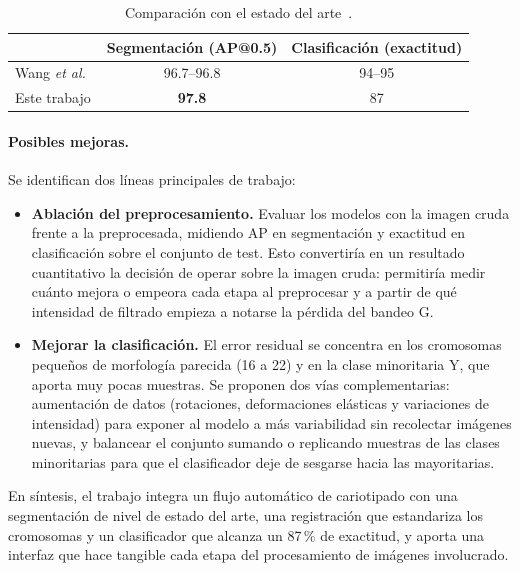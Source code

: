 \documentclass[11pt,a4paper]{article}
\begin{document}
\begin{table}[H]
  \centering
  \small
  \caption{Comparación con el estado del arte~\cite{wang2024fully}.}
  \label{tab:comparacion}
  \begin{tabular}{lcc}
    \toprule
    & Segmentación (AP@0.5) & Clasificación (exactitud) \\
    \midrule
    Wang \textit{et al.}~\cite{wang2024fully} & 96.7--96.8 & 94--95 \\
    Este trabajo & \textbf{97.8} & 87 \\
    \bottomrule
  \end{tabular}
\end{table}

\paragraph{Posibles mejoras.} Se identifican dos líneas principales de trabajo:

\begin{itemize}[topsep=2pt,itemsep=1pt]
  \item \textbf{Ablación del preprocesamiento.} Evaluar los modelos con la imagen
        cruda frente a la preprocesada, midiendo AP en segmentación y exactitud en
        clasificación sobre el conjunto de test. Esto convertiría en un resultado
        cuantitativo la decisión de operar sobre la imagen cruda: permitiría medir
        cuánto mejora o empeora cada etapa al preprocesar y a partir de qué
        intensidad de filtrado empieza a notarse la pérdida del bandeo G.
  \item \textbf{Mejorar la clasificación.} El error residual se concentra en los
        cromosomas pequeños de morfología parecida (16 a 22) y en la clase
        minoritaria Y, que aporta muy pocas muestras. Se proponen dos vías
        complementarias: aumentación de datos (rotaciones, deformaciones elásticas y
        variaciones de intensidad) para exponer al modelo a más variabilidad sin
        recolectar imágenes nuevas, y balancear el conjunto sumando o replicando
        muestras de las clases minoritarias para que el clasificador deje de
        sesgarse hacia las mayoritarias.
\end{itemize}

En síntesis, el trabajo integra un flujo automático de cariotipado con una
segmentación de nivel de estado del arte, una registración que estandariza los
cromosomas y un clasificador que alcanza un 87\,\% de exactitud, y aporta una
interfaz que hace tangible cada etapa del procesamiento de imágenes involucrado.
\end{document}
